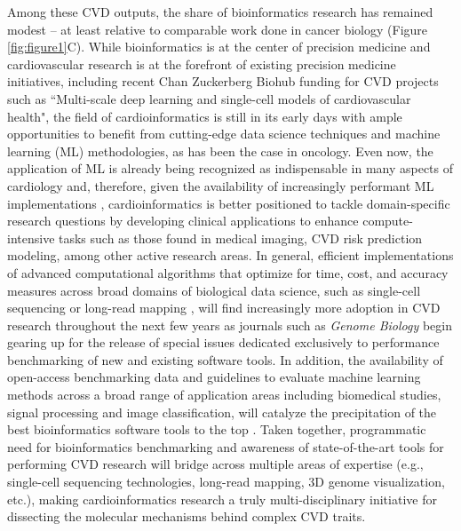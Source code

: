 \documentclass[letter]{bioinfo}
\begin{document}
Among these CVD outputs, the share of bioinformatics research has remained modest -- at least relative to comparable work done in cancer biology (Figure \ref{fig:figure1}C). While bioinformatics is at the center of precision medicine \citep{Gomez-Lopez:2017:Precision} and cardiovascular research is at the forefront of existing precision medicine initiatives, including recent Chan Zuckerberg Biohub funding for CVD projects such as ``Multi-scale deep learning and single-cell models of cardiovascular health", the field of cardioinformatics is still in its early days with ample opportunities to benefit from cutting-edge data science techniques and machine learning (ML) methodologies, as has been the case in oncology.  Even now, the application of ML is already being recognized as indispensable in many aspects of cardiology \citep{Shameer:2017:Translational,Shameer:2018:Machine} and, therefore, given the availability of increasingly performant ML implementations \citep{MLPerf:2018:MLPerf}, cardioinformatics is better positioned to tackle domain-specific research questions by developing clinical applications to enhance compute-intensive tasks such as those found in medical imaging, CVD risk prediction modeling, among other active research areas. In general, efficient implementations of advanced computational algorithms that optimize for time, cost, and accuracy measures across broad domains of biological data science, such as single-cell sequencing \citep{Becht:2018:Evaluation} or long-read mapping \citep{Li:2018:Minimap2}, will find increasingly more adoption in CVD research throughout the next few years as journals such as \emph{Genome Biology} begin gearing up for the release of special issues dedicated exclusively to performance benchmarking of new and existing software tools.  In addition, the availability of open-access benchmarking data and guidelines to evaluate machine learning methods across a broad range of application areas including biomedical studies, signal processing and image classification, will catalyze the precipitation of the best bioinformatics software tools to the top \citep{Olson:2017:PMLB,Weber:2018:Essential}.  Taken together, programmatic need for bioinformatics benchmarking and awareness of state-of-the-art tools for performing CVD research will bridge across multiple areas of expertise (e.g., single-cell sequencing technologies, long-read mapping, 3D genome visualization, etc.), making cardioinformatics research a truly multi-disciplinary initiative for dissecting the molecular mechanisms behind complex CVD traits.   
\end{document}
